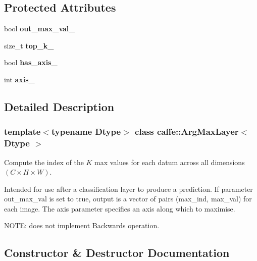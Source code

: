 \subsection*{Protected Attributes}
\begin{DoxyCompactItemize}
\item 
\mbox{\label{classcaffe_1_1_arg_max_layer_a80166873c75bdbb9a8aaa43e63543684}} 
bool {\bfseries out\+\_\+max\+\_\+val\+\_\+}
\item 
\mbox{\label{classcaffe_1_1_arg_max_layer_a936d87cd98fe0c508f5d7feb17c5f989}} 
size\+\_\+t {\bfseries top\+\_\+k\+\_\+}
\item 
\mbox{\label{classcaffe_1_1_arg_max_layer_aad30a415d4d23ce890f9ddf0c7efcb4b}} 
bool {\bfseries has\+\_\+axis\+\_\+}
\item 
\mbox{\label{classcaffe_1_1_arg_max_layer_af0c7ee3334644eef4b7d7d47cb5890a7}} 
int {\bfseries axis\+\_\+}
\end{DoxyCompactItemize}


\subsection{Detailed Description}
\subsubsection*{template$<$typename Dtype$>$\newline
class caffe\+::\+Arg\+Max\+Layer$<$ Dtype $>$}

Compute the index of the $ K $ max values for each datum across all dimensions $ (C \times H \times W) $. 

Intended for use after a classification layer to produce a prediction. If parameter out\+\_\+max\+\_\+val is set to true, output is a vector of pairs (max\+\_\+ind, max\+\_\+val) for each image. The axis parameter specifies an axis along which to maximise.

N\+O\+TE\+: does not implement Backwards operation. 

\subsection{Constructor \& Destructor Documentation}
\mbox{\label{classcaffe_1_1_arg_max_layer_a77429601f3d7f27b48720a1b703491be}} 
